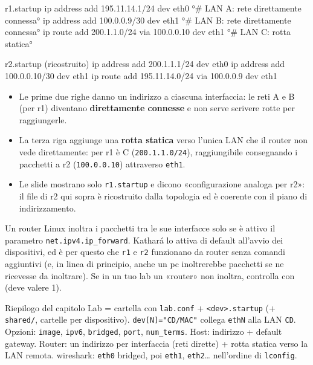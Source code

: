 \begin{filecfg}{r1.startup}
ip address add 195.11.14.1/24 dev eth0    °# LAN A: rete direttamente connessa°
ip address add 100.0.0.9/30 dev eth1      °# LAN B: rete direttamente connessa°
ip route add 200.1.1.0/24 via 100.0.0.10 dev eth1   °# LAN C: rotta statica°
\end{filecfg}
\begin{filecfg}{r2.startup  (ricostruito)}
ip address add 200.1.1.1/24 dev eth0
ip address add 100.0.0.10/30 dev eth1
ip route add 195.11.14.0/24 via 100.0.0.9 dev eth1
\end{filecfg}
\begin{tecnica}
\begin{itemize}
  \item Le prime due righe danno un indirizzo a ciascuna interfaccia: le reti A e B (per r1) diventano \textbf{direttamente connesse} e non serve scrivere rotte per raggiungerle.
  \item La terza riga aggiunge una \textbf{rotta statica} verso l'unica LAN che il router non vede direttamente: per r1 è C (\texttt{200.1.1.0/24}), raggiungibile consegnando i pacchetti a r2 (\texttt{100.0.0.10}) attraverso \texttt{eth1}.
  \item Le slide mostrano solo \texttt{r1.startup} e dicono «configurazione analoga per r2»: il file di r2 qui sopra è ricostruito dalla topologia ed è coerente con il piano di indirizzamento.
\end{itemize}
\end{tecnica}
\begin{attenzione}[Il forwarding]
Un router Linux inoltra i pacchetti tra le sue interfacce solo se è attivo il parametro \texttt{net.ipv4.ip\_forward}. Kathará lo attiva di default all'avvio dei dispositivi, ed è per questo che \texttt{r1} e \texttt{r2} funzionano da router senza comandi aggiuntivi (e, in linea di principio, anche un pc inoltrerebbe pacchetti se ne ricevesse da inoltrare). Se in un tuo lab un «router» non inoltra, controlla con  (deve valere 1).
\end{attenzione}

\begin{appunti}{Riepilogo del capitolo}
Lab = cartella con \texttt{lab.conf} + \texttt{<dev>.startup} (+ \texttt{shared/}, cartelle per dispositivo). \texttt{dev[N]="CD/MAC"} collega \texttt{ethN} alla LAN \texttt{CD}. Opzioni: \texttt{image}, \texttt{ipv6}, \texttt{bridged}, \texttt{port}, \texttt{num\_terms}. Host: indirizzo + default gateway. Router: un indirizzo per interfaccia (reti dirette) + rotta statica verso la LAN remota. wireshark: \texttt{eth0} bridged, poi \texttt{eth1}, \texttt{eth2}\dots{} nell'ordine di \texttt{lconfig}.
\end{appunti}
